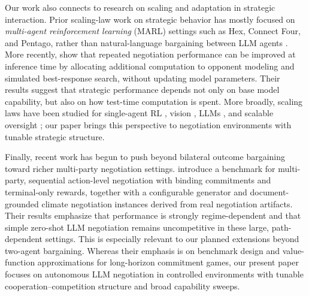 Our work also connects to research on scaling and adaptation in strategic interaction.
Prior scaling-law work on strategic behavior has mostly focused on \emph{multi-agent reinforcement learning} (MARL) settings such as Hex, Connect Four, and Pentago, rather than natural-language bargaining between LLM agents \citep{jones_scaling_2021,neumann_scaling_2022}.
More recently, \citet{liu_scaling_2026} show that repeated negotiation performance can be improved at inference time by allocating additional computation to opponent modeling and simulated best-response search, without updating model parameters.
Their results suggest that strategic performance depends not only on base model capability, but also on how test-time computation is spent.
More broadly, scaling laws have been studied for single-agent RL \citep{hilton_scaling_2023}, vision \citep{Zhai2022}, LLMs \citep{hoffmann_training_2022,kaplan_scaling_2020}, and scalable oversight \citep{engels_scaling_2025}; our paper brings this perspective to negotiation environments with tunable strategic structure.

Finally, recent work has begun to push beyond bilateral outcome bargaining toward richer multi-party negotiation settings.
\citet{benac_benchmark_2026} introduce a benchmark for multi-party, sequential action-level negotiation with binding commitments and terminal-only rewards, together with a configurable generator and document-grounded climate negotiation instances derived from real negotiation artifacts.
Their results emphasize that performance is strongly regime-dependent and that simple zero-shot LLM negotiation remains uncompetitive in these large, path-dependent settings.
This is especially relevant to our planned extensions beyond two-agent bargaining.
Whereas their emphasis is on benchmark design and value-function approximations for long-horizon commitment games, our present paper focuses on autonomous LLM negotiation in controlled environments with tunable cooperation--competition structure and broad capability sweeps.

